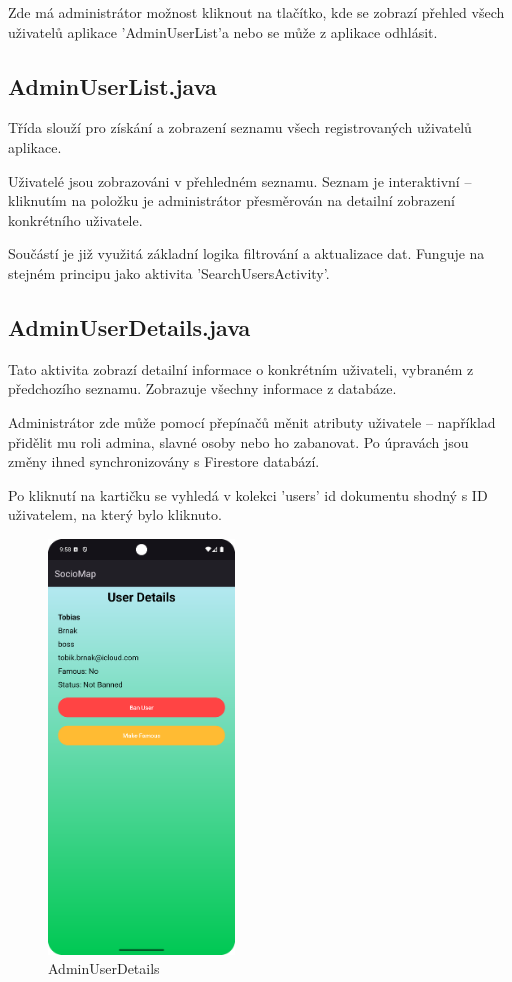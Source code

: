 Zde má administrátor možnost kliknout na tlačítko, kde se zobrazí přehled všech uživatelů aplikace 'AdminUserList'a nebo se může z aplikace odhlásit.




\subsection*{AdminUserList.java}

Třída slouží pro získání a zobrazení seznamu všech registrovaných uživatelů aplikace.

Uživatelé jsou zobrazováni v přehledném seznamu. Seznam je interaktivní – kliknutím na položku je administrátor přesměrován na detailní zobrazení konkrétního uživatele.

Součástí je již využitá základní logika filtrování a aktualizace dat. Funguje na stejném principu jako aktivita 'SearchUsersActivity'.









\subsection*{AdminUserDetails.java}

Tato aktivita zobrazí detailní informace o konkrétním uživateli, vybraném z předchozího seznamu. Zobrazuje všechny informace z databáze.


Administrátor zde může pomocí přepínačů měnit atributy uživatele – například přidělit mu roli admina, slavné osoby nebo ho zabanovat. Po úpravách jsou změny ihned synchronizovány s Firestore databází.

Po kliknutí na kartičku se vyhledá v kolekci 'users' id dokumentu shodný s ID uživatelem, na který bylo kliknuto.

\begin{figure}[H]
    \centering
    \includegraphics[height=11cm]{Images/AdminDetail.png}
    \caption{AdminUserDetails}
    \label{fig:Update-account}
\end{figure}








